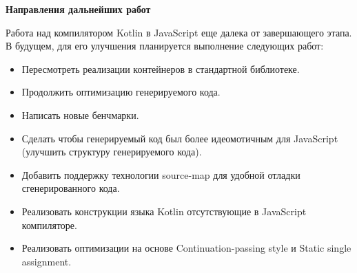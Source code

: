 \null
\begin{LARGE}
\begin{center}
\textbf{Направления дальнейших работ}
\end{center}
\end{LARGE}

Работа над компилятором Kotlin в JavaScript еще далека от завершающего этапа. В будущем, для его улучшения планируется выполнение следующих работ:
\begin{itemize}
\item Пересмотреть реализации контейнеров в стандартной библиотеке.
\item Продолжить оптимизацию генерируемого кода.
\item Написать новые бенчмарки. 
\item Сделать чтобы генерируемый код был более идеомотичным для JavaScript (улучшить структуру генерируемого кода).
\item Добавить поддержку технологии source-map для удобной отладки сгенерированного кода.
\item Реализовать конструкции языка Kotlin отсутствующие в JavaScript компиляторе.
\item Реализовать оптимизации на основе Continuation-passing style и 
Static single assignment.
\end{itemize}